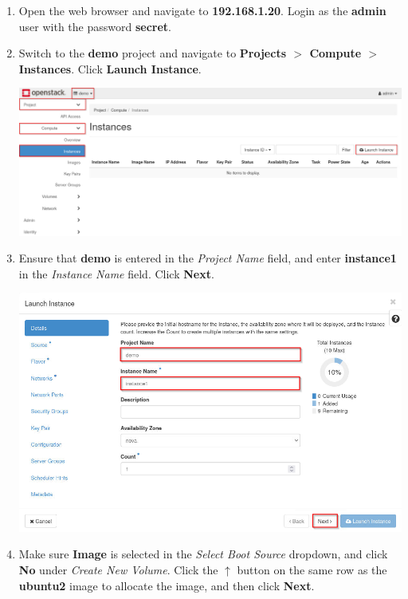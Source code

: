 \documentclass[letterpaper, 12pt]{article}
\begin{document}
\begin{enumerate}
    \item Open the web browser and navigate to \textbf{192.168.1.20}. Login as the \textbf{admin} user with the password
    \textbf{secret}.

    \item Switch to the \textbf{demo} project and navigate to
    \textbf{Projects $>$ Compute $>$ Instances}. Click \textbf{Launch Instance}.

    \begin{center}
        \includegraphics[width=\linewidth]{images/part4/step2.png}
    \end{center}

    \item Ensure that \textbf{demo} is entered in the \textit{Project Name} field, and enter \textbf{instance1} in the
    \textit{Instance Name} field. Click \textbf{Next}.
    
    \begin{center}
        \includegraphics[width=\linewidth]{images/part4/step3.png}
    \end{center}

    \item Make sure \textbf{Image} is selected in the \textit{Select Boot Source} dropdown, and click \textbf{No} under
    \textit{Create New Volume}. Click the $\uparrow$ button on the same row as the \textbf{ubuntu2} image to allocate the
    image, and then click \textbf{Next}.


\end{enumerate}
\end{document}
